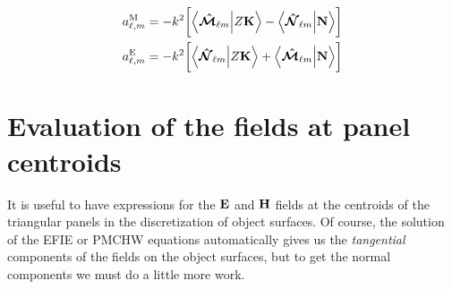 \documentclass[letterpaper]{article}
\begin{document}
\begin{subequations}
\begin{align}
a^{\hbox{\scriptsize{M}}}_{\ell,m}
 &= -k^2\bigg[ \Big\langle  \boldsymbol{\hat{\mathcal{M}}}_{\ell m}  \Big| Z\mathbf{K} \Big\rangle
              -\Big\langle  \boldsymbol{\hat{\mathcal{N}}}_{\ell m}  \Big| \mathbf{N} \Big\rangle
        \bigg]
\\
a^{\hbox{\scriptsize{E}}}_{\ell,m}
 &= -k^2\bigg[  \Big\langle  \boldsymbol{\hat{\mathcal{N}}}_{\ell m}  \Big| Z\mathbf{K} \Big\rangle
               +\Big\langle  \boldsymbol{\hat{\mathcal{M}}}_{\ell m}  \Big| \mathbf{N} \Big\rangle
        \bigg]
\end{align}
\label{SphericalMultipolesFromKN}
\end{subequations}

\newpage
\section{Evaluation of the fields at panel centroids}

It is useful to have expressions for the $\mathbf{E}$ and $\mathbf{H}$
fields at the centroids of the triangular panels in the
discretization of object surfaces. Of course, the solution 
of the EFIE or PMCHW equations automatically gives us the 
\textit{tangential} components of the fields on the object
surfaces, but to get the normal components we must do a little
more work. 
\end{document}
